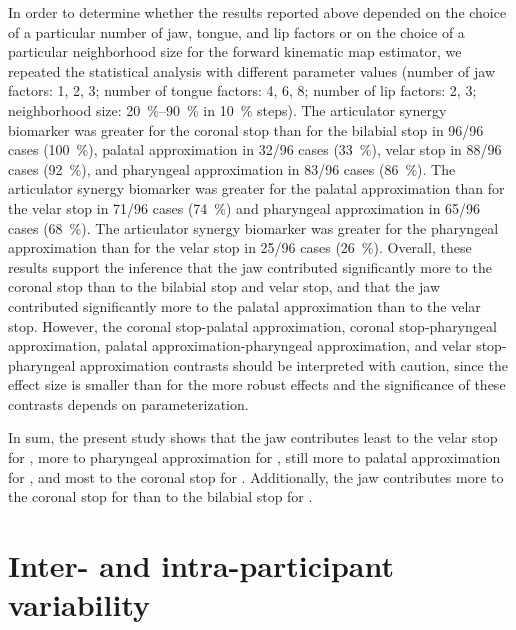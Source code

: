 \documentclass[preprint]{JASAnew}\usepackage[]{graphicx}\usepackage[]{color}
\begin{document}
In order to determine whether the results reported above depended on the choice of a particular number of jaw, tongue, and lip factors or on the choice of a particular neighborhood size for the forward kinematic map estimator, we repeated the statistical analysis with different parameter values (number of jaw factors: 1, 2, 3; number of tongue factors: 4, 6, 8; number of lip factors: 2, 3; neighborhood size: \SIrange{20}{90}{\percent} in \SI{10}{\percent} steps).
%
The articulator synergy biomarker was greater for the coronal stop than for the 
%
bilabial stop in 96/96 cases 
(\SI{100}{\percent}), 
%
palatal approximation in 32/96 cases
(\SI{33}{\percent}), 
velar stop in 88/96 cases 
(\SI{92}{\percent}), 
and pharyngeal approximation in 83/96 cases
(\SI{86}{\percent}).
%
The articulator synergy biomarker was greater for the palatal approximation than for the 
%
velar stop in 71/96 cases
(\SI{74}{\percent})
and pharyngeal approximation in 65/96 cases
(\SI{68}{\percent}).
%
The articulator synergy biomarker was greater for the pharyngeal approximation than for the 
%
velar stop in 25/96 cases 
(\SI{26}{\percent}).
%
Overall, these results support the inference that the jaw contributed significantly more to the coronal stop than to the bilabial stop and velar stop,
%
and that the jaw contributed significantly more to the palatal approximation than to the velar stop.
%
However, the coronal stop-palatal approximation, coronal stop-pharyngeal approximation, palatal approximation-pharyngeal approximation, and velar stop-pharyngeal approximation contrasts should be interpreted with caution, since the effect size is smaller than for the more robust effects and the significance of these contrasts depends on parameterization.



In sum, the present study shows that the jaw contributes 
least to the velar stop for \textipa{[k]},
more to pharyngeal approximation for \textipa{[A]}, 
still more to palatal approximation for \textipa{[i]},
and most to the coronal stop for \textipa{[t]}.
Additionally, the jaw contributes more to the coronal stop for \textipa{[t]} than to the bilabial stop for \textipa{[p]}.








\section{Inter- and intra-participant variability}
\label{sec:patterns}
\end{document}
